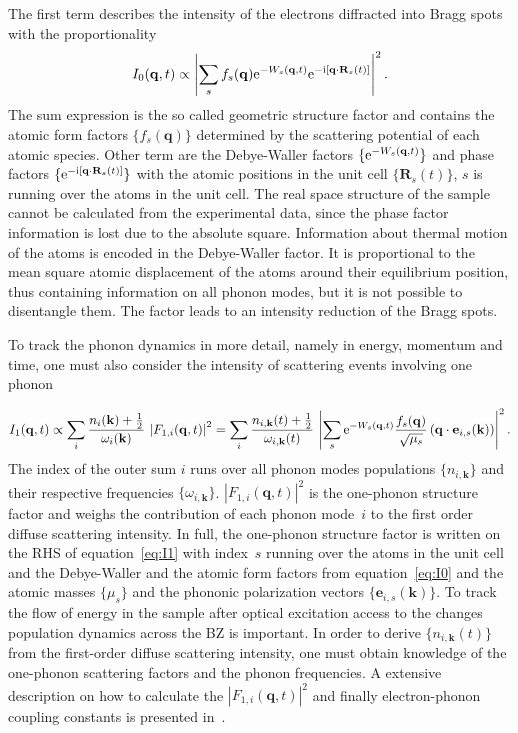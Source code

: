 The first term describes the intensity of the electrons diffracted into Bragg spots with the proportionality
\begin{equation} I_0(\mathbf{q}, t) \propto \left| \sum_s f_s(\mathbf{q}) \mathrm{e}^{-W_s(\mathbf{q},t)} \mathrm{e}^{-\mathrm{i}[\mathbf{q}\cdot\mathbf{R}_s(t)]} \right| ^2.\label{eq:I0}\end{equation}
The sum expression is the so called geometric structure factor and contains the atomic form factors $\{f_s(\mathbf{q})\}$ determined by the scattering potential of each atomic species. Other term are the Debye-Waller factors $\{\mathrm{e}^{-W_s(\mathbf{q},t)}\}$ and phase factors $\{\mathrm{e}^{-\mathrm{i}[\mathbf{q}\cdot\mathbf{R}_s(t)]}\}$ with the atomic positions in the unit cell $\{\mathbf{R}_s(t)\}$, $s$ is running over the atoms in the unit cell.
The real space structure of the sample cannot be calculated from the experimental data, since the phase factor information is lost due to the absolute square.
Information about thermal motion of the atoms is encoded in the Debye-Waller factor.
It is proportional to the mean square atomic displacement of the atoms around their equilibrium position, thus containing information on all phonon modes, but it is not possible to disentangle them.
The factor leads to an intensity reduction of the Bragg spots.

To track the phonon dynamics in more detail, namely in energy, momentum and time, one must also consider the intensity of scattering events involving one phonon

\begin{equation} I_1(\mathbf{q},t) \propto \sum_i \frac{n_i(\mathbf{k})+\frac{1}{2}}{\omega_i(\mathbf{k})}\,\left| F_{1,i}(\mathbf{q},t) \right|^2 = \sum_i \frac{n_{i,\mathbf{k}}(t)+\frac{1}{2}}{\omega_{i,\mathbf{k}}(t)}\,\left| \sum_s \mathrm{e}^{-W_s(\mathbf{q},t)} \frac{f_s(\mathbf{q})}{\sqrt{\mu_s}} \left( \mathbf{q}\cdot\mathbf{e}_{i, s}(\mathbf{k}) \right) \right|^2.\label{eq:I1}\end{equation}
The index of the outer sum $i$ runs over all phonon modes populations $\{n_{i,\mathbf{k}}\}$ and their respective frequencies $\{\omega_{i,\mathbf{k}}\}$.
$\left| F_{1,i}(\mathbf{q},t) \right|^2$ is the one-phonon structure factor and weighs the contribution of each phonon mode~$i$ to the first order diffuse scattering intensity.
In full, the one-phonon structure factor is written on the RHS of equation~\ref{eq:I1} with index~$s$ running over the atoms in the unit cell and the Debye-Waller and the atomic form factors from equation~\ref{eq:I0} and the atomic masses $\{\mu_s\}$ and the phononic polarization vectors $\{\mathbf{e}_{i, s}(\mathbf{k})\}$.
To track the flow of energy in the sample after optical excitation access to the changes population dynamics across the \ac{BZ} is important.
In order to derive $\{n_{i,\mathbf{k}}(t)\}$ from the first-order diffuse scattering intensity, one must obtain knowledge of the one-phonon scattering factors and the phonon frequencies.
A extensive description on how to calculate the $\left| F_{1,i}(\mathbf{q},t) \right|^2$ and finally electron-phonon coupling constants is presented in~\cite{stern2018,renedecotret2019}.

